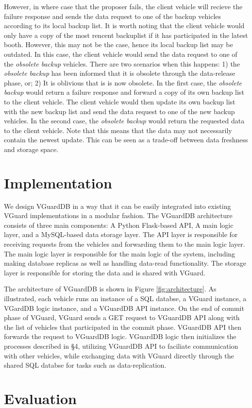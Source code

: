 However, in where case that the proposer fails, the client vehicle will recieve the failure response and sends the data request to one of the backup vehicles according to its local backup list. It is worth noting that the client vehicle would only have a copy of the most rencent backuplist if it has participated in the latest booth. However, this may not be the case, hence its local backup list may be outdated. In this case, the client vehicle would send the data request to one of the \textit{obsolete backup} vehicles. There are two scenarios when this happens: 1) the \textit{obsolete backup} has been informed that it is obsolete through the data-release phase, or; 2) It is oblivious that is is now obsolete. In the first case, the \textit{obsolete backup} would return a failure response and forward a copy of its own backup list to the client vehicle. The client vehicle would then update its own backup list with the new backup list and send the data request to one of the new backup vehicles. In the second case, the \textit{obsolete backup} would return the requested data to the client vehicle. Note that this means that the data may not necessarily contain the newest update. This can be seen as a trade-off between data freshness and storage space.

\section{Implementation}
We design VGuardDB in a way that it can be easily integrated into existing VGuard implementations in a modular fashion. The VGuardDB architecture consists of three main components: A Python Flask-based API, A main logic layer, and a MySQL-based data storage layer. The API layer is responsible for receiving requests from the vehicles and forwarding them to the main logic layer. The main logic layer is responsible for the main logic of the system, including making database replicas as well as handling data-read functionality. The storage layer is responsible for storing the data and is shared with VGuard.

The architecture of VGuardDB is shown in Figure \ref{fig:architecture}. As illustrated, each vehicle runs an instance of a SQL databse, a VGuard instance, a VGardDB logic instance, and a VGuardDB API instance. On the end of commit phase of VGuard, VGuard sends a GET request to VGuardDB API along with the list of vehicles that participated in the commit phase. VGuardDB API then forwards the request to VGuardDB logic. VGuardDB logic then initializes the processes described in \S 4, utilizing VGuardDB API to faciliate communication with other vehicles, while exchanging data with VGuard directly through the shared SQL databse for tasks such as data-replication.

\section{Evaluation}


